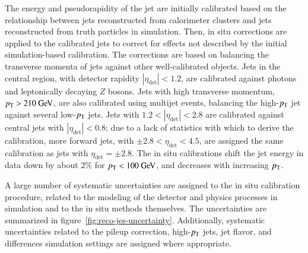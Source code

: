 The energy and pseudorapidity of the jet are initially calibrated based on the relationship between jets reconstructed from calorimeter clusters and jets reconstructed from truth particles in simulation. Then, in situ corrections are applied to the calibrated jets to correct for effects not described by the initial simulation-based calibration. The corrections are based on balancing the transverse momenta of jets against other well-calibrated objects. Jets in the central region, with detector rapidity $|\eta_{\mathrm{det}}|<1.2$, are calibrated against photons and leptonically decaying $Z$ bosons. Jets with high transverse momentum, $\pt>210 \GeV$, are also calibrated using multijet events, balancing the high-$p_{\text{T}}$ jet against several low-$p_{\text{T}}$ jets. Jets with $1.2<|\eta_{\mathrm{det}}|<2.8$ are calibrated against central jets with $|\eta_{\mathrm{det}}|<0.8$; due to a lack of statistics with which to derive the calibration, more forward jets, with $\pm2.8<\eta_{\mathrm{det}}<4.5$, are assigned the same calibration as jets with $\eta_{\mathrm{det}}=\pm2.8$. The in situ calibrations shift the jet energy in data down by about $2\%$ for $\pt<100 \GeV$, and decreases with increasing $p_{\text{T}}$. 

A large number of systematic uncertainties are assigned to the in situ calibration procedure, related to the modeling of the detector and physics processes in simulation and to the in situ methods themselves. The uncertainties are summarized in figure~\ref{fig:reco-jes-uncertainty}. Additionally, systematic uncertainties related to the pileup correction, high-$p_{\text{T}}$ jets, jet flavor, and differences simulation settings are assigned where appropriate.

